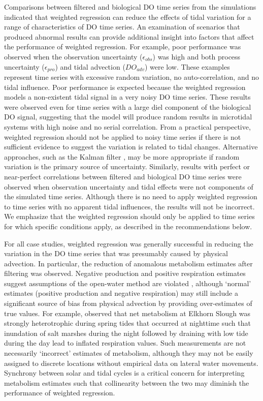 \documentclass[letterpaper,12pt,oneside]{article}\usepackage[]{graphicx}\usepackage[]{color}
\begin{document}
Comparisons between filtered and biological \ac{DO} time series from the simulations indicated that weighted regression can reduce the effects of tidal variation for a range of characteristics of \ac{DO} time series.  An examination of scenarios that produced abnormal results can provide additional insight into factors that affect the performance of weighted regression.  For example, poor performance was observed when the observation uncertainty ($\epsilon_{obs}$) was high and both process uncertainty ($\epsilon_{pro}$) and tidal advection ($DO_{adv}$) were low.  These examples represent time series with excessive random variation, no auto-correlation, and no tidal influence.  Poor performance is expected because the weighted regression models a non-existent tidal signal in a very noisy \ac{DO} time series.  These results were observed even for time series with a large diel component of the biological \ac{DO} signal, suggesting that the model will produce random results in microtidal systems with high noise and no serial correlation.  From a practical perspective, weighted regression should not be applied to noisy time series if there is not sufficient evidence to suggest the variation is related to tidal changes.  Alternative approaches, such as the Kalman filter \citep{Harvey89,Batt12}, may be more appropriate if random variation is the primary source of uncertainty.  Similarly, results with perfect or near-perfect correlations between filtered and biological \ac{DO} time series were observed when observation uncertainty and tidal effects were not components of the simulated time series.  Although there is no need to apply weighted regression to time series with no apparent tidal influences, the results will not be incorrect.  We emphasize that the weighted regression should only be applied to time series for which specific conditions apply, as described in the recommendations below.  

For all case studies, weighted regression was generally successful in reducing the variation in the \ac{DO} time series that was presumably caused by physical advection.  In particular, the reduction of anomalous metabolism estimates after filtering was observed.  Negative production and positive respiration estimates suggest assumptions of the open-water method are violated \citep{Needoba12}, although `normal' estimates (positive production and negative respiration) may still include a significant source of bias from physical advection by providing over-estimates of true values.  For example, \citet{Nidzieko14} observed that net metabolism at Elkhorn Slough was strongly heterotrophic during spring tides that occurred at nighttime such that inundation of salt marshes during the night followed by draining with low tide during the day lead to inflated respiration values.  Such measurements are not necessarily `incorrect' estimates of metabolism, although they may not be easily assigned to discrete locations without empirical data on lateral water movements. Synchrony between solar and tidal cycles is a critical concern for interpreting metabolism estimates such that collinearity between the two may diminish the performance of weighted regression. 
\end{document}
